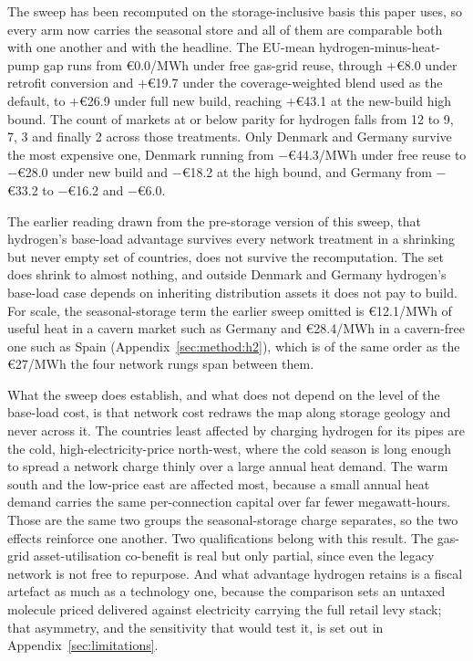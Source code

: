 The sweep has been recomputed on the storage-inclusive basis this paper uses, so
every arm now carries the seasonal store and all of them are comparable both with one
another and with the headline. The EU-mean hydrogen-minus-heat-pump gap runs from
\euro{}0.0/MWh under free gas-grid reuse, through $+$\euro{}8.0 under retrofit
conversion and $+$\euro{}19.7 under the coverage-weighted blend used as the default,
to $+$\euro{}26.9 under full new build, reaching $+$\euro{}43.1 at the new-build high
bound. The count of markets at or below parity for hydrogen falls from 12 to 9, 7, 3
and finally 2 across those treatments. Only Denmark and Germany survive the most
expensive one, Denmark running from $-$\euro{}44.3/MWh under free reuse to
$-$\euro{}28.0 under new build and $-$\euro{}18.2 at the high bound, and Germany from
$-$\euro{}33.2 to $-$\euro{}16.2 and $-$\euro{}6.0.

The earlier reading drawn from the pre-storage version of this sweep, that hydrogen's
base-load advantage survives every network treatment in a shrinking but never empty
set of countries, does not survive the recomputation. The set does shrink to almost
nothing, and outside Denmark and Germany hydrogen's base-load case depends on
inheriting distribution assets it does not pay to build. For scale, the seasonal-storage
term the earlier sweep omitted is \euro{}12.1/MWh of useful heat in a cavern market such
as Germany and \euro{}28.4/MWh in a cavern-free one such as Spain
(Appendix~\ref{sec:method:h2}), which is of the same order as the \euro{}27/MWh the four
network rungs span between them.

What the sweep does establish, and what does not depend on the level of the
base-load cost, is that network cost redraws the map along storage geology and never across it. The countries least affected by charging
hydrogen for its pipes are the cold, high-electricity-price north-west, where the
cold season is long enough to spread a network charge thinly over a large annual
heat demand. The warm south and the low-price east are affected most, because a
small annual heat demand carries the same per-connection capital over far fewer
megawatt-hours. Those are the same two groups the seasonal-storage charge separates,
so the two effects reinforce one another. Two qualifications belong with this
result. The gas-grid asset-utilisation co-benefit is real but only partial, since
even the legacy network is not free to repurpose. And what advantage hydrogen
retains is a fiscal artefact as much as a technology one, because the comparison
sets an untaxed molecule priced delivered against electricity carrying
the full retail levy stack; that asymmetry, and the sensitivity that would test it,
is set out in Appendix~\ref{sec:limitations}.

